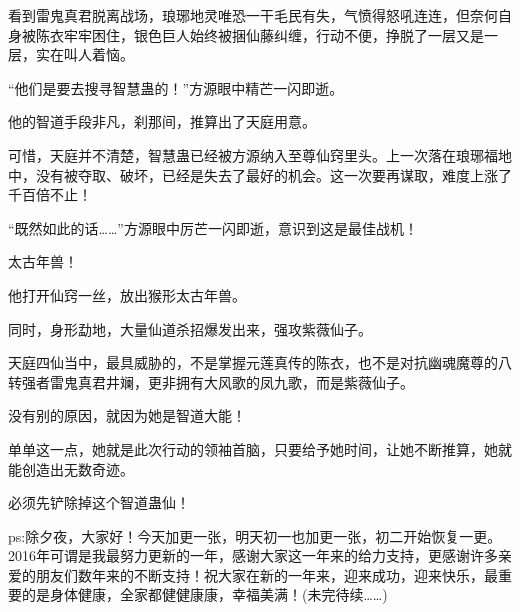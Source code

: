 \begin{this_body}
看到雷鬼真君脱离战场，琅琊地灵唯恐一干毛民有失，气愤得怒吼连连，但奈何自身被陈衣牢牢困住，银色巨人始终被捆仙藤纠缠，行动不便，挣脱了一层又是一层，实在叫人着恼。

“他们是要去搜寻智慧蛊的！”方源眼中精芒一闪即逝。

他的智道手段非凡，刹那间，推算出了天庭用意。

可惜，天庭并不清楚，智慧蛊已经被方源纳入至尊仙窍里头。上一次落在琅琊福地中，没有被夺取、破坏，已经是失去了最好的机会。这一次要再谋取，难度上涨了千百倍不止！

“既然如此的话……”方源眼中厉芒一闪即逝，意识到这是最佳战机！

太古年兽！

他打开仙窍一丝，放出猴形太古年兽。

同时，身形勐地，大量仙道杀招爆发出来，强攻紫薇仙子。

天庭四仙当中，最具威胁的，不是掌握元莲真传的陈衣，也不是对抗幽魂魔尊的八转强者雷鬼真君井斓，更非拥有大风歌的凤九歌，而是紫薇仙子。

没有别的原因，就因为她是智道大能！

单单这一点，她就是此次行动的领袖首脑，只要给予她时间，让她不断推算，她就能创造出无数奇迹。

必须先铲除掉这个智道蛊仙！

ps:除夕夜，大家好！今天加更一张，明天初一也加更一张，初二开始恢复一更。2016年可谓是我最努力更新的一年，感谢大家这一年来的给力支持，更感谢许多亲爱的朋友们数年来的不断支持！祝大家在新的一年来，迎来成功，迎来快乐，最重要的是身体健康，全家都健健康康，幸福美满！(未完待续……)

\end{this_body}

